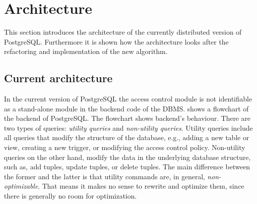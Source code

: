 \section{Architecture}
%
This section introduces the architecture of the currently distributed version of PostgreSQL.
%
Furthermore it is shown how the architecture looks after the refactoring and implementation of the new algorithm.
%
\subsection{Current architecture}


%
In the current version of PostgreSQL the access control module is not identifiable as a stand-alone module in the backend code of the DBMS.
%
 shows a flowchart of the backend of PostgreSQL. The flowchart shows backend's behaviour.
%
There are two types of queries: \emph{utility queries} and \emph{non-utility queries}.
%
Utility queries include all queries that modify the structure of the database, e.g., adding a new table or view, creating a new trigger, or modifying the access control policy.
%
Non-utility queries on the other hand, modify the data in the underlying database structure, such as, add tuples, update tuples, or delete tuples.
%
The main difference between the former and the latter is that utility commands are, in general, \emph{non-optimizable}. 
%
That means it makes no sense to rewrite and optimize them, since there is generally no room for optimization.

